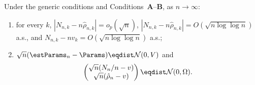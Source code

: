 \begin{theorem}\label{thm:normality}
Under the generic conditions and Conditions~\textbf{A}--\textbf{B}, as
$n\to\infty$:
\begin{enumerate}
  \item[(i)] for every $k$, $|N_{n,k}-n\hat{\rho}_{n,k}|=o_p(\sqrt n)$,
        $|N_{n,k}-n\hat{\rho}_{n,k}|=O(\sqrt{n\log\log n})$ a.s., and
        $N_{n,k}-nv_k=O(\sqrt{n\log\log n})$ a.s.;
  \item[(ii)] $\sqrt n(\estParams_n-\Params)\eqdist\mathcal{N}(0,V)$ and
        \[
          \begin{pmatrix}\sqrt n(N_n/n - v)\\ \sqrt n(\hat{\rho}_n - v)\end{pmatrix}
          \eqdist \mathcal{N}(0,\Omega).
        \]
\end{enumerate}
\end{theorem}

